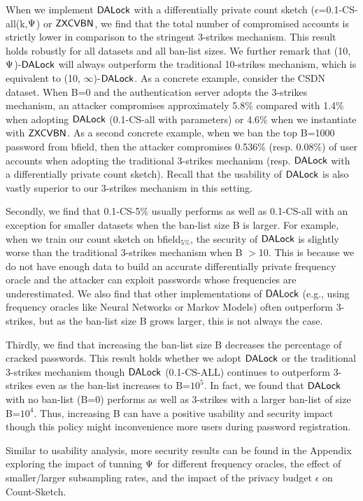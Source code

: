 When we implement $\mathsf{DALock}$ with a differentially private count sketch ($\epsilon$=0.1-CS-all(k,$\Psi$) or $\mathsf{ZXCVBN}$, we find that the total number of compromised accounts is strictly lower in comparison to the stringent 3-strikes mechanism. This result holds robustly for all datasets and all ban-list sizes. We further remark that (10,$\Psi$)-$\mathsf{DALock}$ will always outperform the traditional 10-strikes mechanism, which is equivalent to (10, $\infty$)-$\mathsf{DALock}$. As a concrete example, consider the CSDN dataset. When B=0 and the authentication server adopts the 3-strikes mechanism, an attacker compromises approximately 5.8\% compared with 1.4\% when adopting $\mathsf{DALock}$ (0.1-CS-all with parameters) or 4.6\% when we instantiate with $\mathsf{ZXCVBN}$. As a second concrete example, when we ban the top B=1000 password from bfield, then the attacker compromises 0.536\% (resp. 0.08\%) of user accounts when adopting the traditional 3-strikes mechanism (resp. $\mathsf{DALock}$ with a differentially private count sketch). Recall that the usability of $\mathsf{DALock}$ is also vastly superior to our 3-strikes mechanism in this setting.

Secondly, we find that 0.1-CS-5\% usually performs as well as 0.1-CS-all with an exception for smaller datasets when the ban-list size B is larger. For example, when we train our count sketch on bfield$_{5\%}$, the security of $\mathsf{DALock}$ is slightly worse than the traditional 3-strikes mechanism when B $>$10. This is because we do not have enough data to build an accurate differentially private frequency oracle and the attacker can exploit passwords whose frequencies are underestimated. We also find that other implementations of $\mathsf{DALock}$ (e.g., using frequency oracles like Neural Networks or Markov Models) often outperform 3-strikes, but as the ban-list size B grows larger, this is not always the case.

Thirdly, we find that increasing the ban-list size B decreases the percentage of cracked passwords. This result holds whether we adopt $\mathsf{DALock}$ or the traditional 3-strikes mechanism though $\mathsf{DALock}$ (0.1-CS-ALL) continues to outperform 3-strikes even as the ban-list increases to B=$10^5$. In fact, we found that $\mathsf{DALock}$ with no ban-list (B=0) performs as well as 3-strikes with a larger ban-list of size B=$10^4$.  Thus, increasing B can have a positive usability and security impact though this policy might inconvenience more users during password registration.  

Similar to usability analysis, more security results can be found in the Appendix exploring the impact of tunning $\Psi$ for different frequency oracles, the effect of smaller/larger subsampling rates, and the impact of the privacy budget $\epsilon$ on Count-Sketch.





